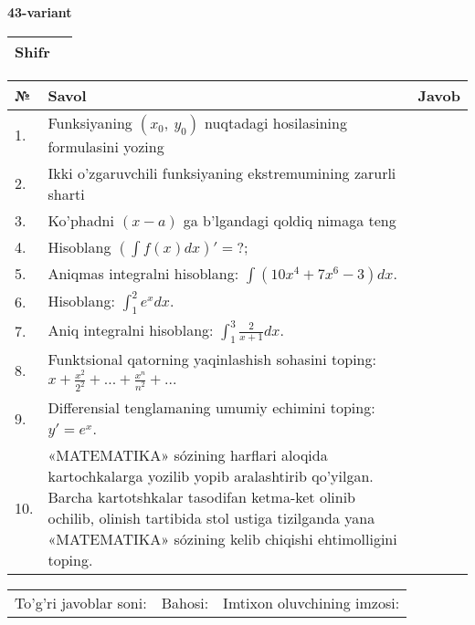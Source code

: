 \documentclass{article}
\begin{document}
  \egroup
  
  \newpage
  
  
  \textbf{43-variant}\\
  
  \bgroup
  \def\arraystretch{1.6} %
  
  \begin{tabular}{|m{5.7cm}|m{9.5cm}|}
  \hline
  Shifr & \\
  \hline
  \end{tabular}
  
  \vspace{1cm}
  
  \begin{tabular}{|m{0.7cm}|m{10cm}|m{4cm}|}
  \hline
  № & Savol & Javob \\
  \hline
  1. & Funksiyaning \((x_{0},\ y_{0})\) nuqtadagi hosilasining formulasini yozing &  \\
  \hline
  2. & Ikki o'zgaruvchili funksiyaning ekstremumining zarurli sharti &  \\
  \hline
  3. & Ko'phadni \((x - a)\) ga b'lgandagi qoldiq nimaga teng &  \\
  \hline
  4. & Hisoblang \(\left( \int {f(x)dx} \right)' = ?\); &  \\
  \hline
  5. & Aniqmas integralni hisoblang: \(\int {\left( 10x^{4} + 7x^{6} - 3 \right)dx}\). &  \\
  \hline
  6. & Hisoblang: \(\int_{1}^{2}{e^{x}dx}\). &  \\
  \hline
  7. & Aniq integralni hisoblang: \(\int_{1}^{3}\frac{2}{x + 1}dx\). &  \\
  \hline
  8. & Funktsional qatorning yaqinlashish sohasini toping: \(x + \frac{x^{2}}{2^{2}} + ... + \frac{x^{n}}{n^{2}} + ...\) &  \\
  \hline
  9. & Differensial tenglamaning umumiy echimini toping: \(y' = e^{x}\). &  \\
  \hline
  10. & «MATEMATIKA» sózining harflari aloqida kartochkalarga yozilib yopib aralashtirib qo'yilgan. Barcha kartotshkalar tasodifan ketma-ket olinib ochilib, olinish tartibida stol ustiga tizilganda yana «MATEMATIKA» sózining kelib chiqishi ehtimolligini toping. &  \\
  \hline
  \end{tabular}
  
  \vspace{1cm}
  
  \begin{tabular}{lll}
  To'g'ri javoblar soni: \underline{\hspace{1.5cm}} & 
  Bahosi: \underline{\hspace{1.5cm}} & 
  Imtixon oluvchining imzosi: \underline{\hspace{2cm}} \\
  \end{tabular}
  
\end{document}
